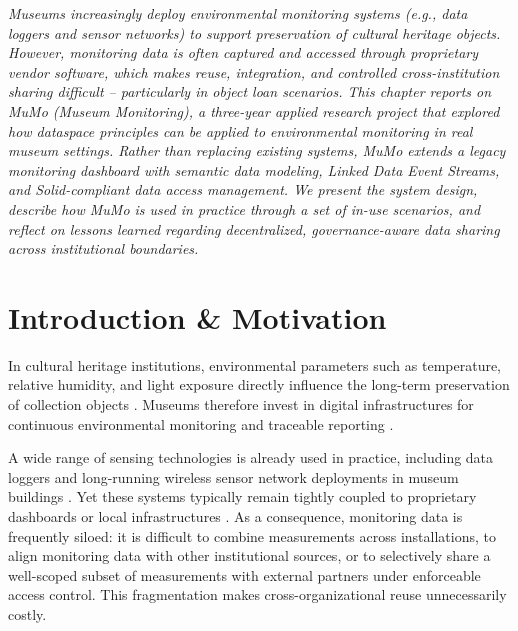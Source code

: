 \providecommand{\tightlist}{%
  \setlength{\itemsep}{0pt}\setlength{\parskip}{0pt}}

\noindent\textit{Museums increasingly deploy environmental monitoring systems (e.g., data
loggers and sensor networks) to support preservation of cultural heritage
objects. However, monitoring data is often captured and accessed through
proprietary vendor software, which makes reuse, integration, and controlled
cross-institution sharing difficult -- particularly in object loan scenarios.
This chapter reports on MuMo (Museum Monitoring), a three-year applied
research project that explored how dataspace principles can be applied to
environmental monitoring in real museum settings. Rather than replacing
existing systems, MuMo extends a legacy monitoring dashboard with semantic
data modeling, Linked Data Event Streams, and Solid-compliant data access
management. We present the system design, describe how MuMo is used in
practice through a set of in-use scenarios, and reflect on lessons learned
regarding decentralized, governance-aware data sharing across institutional
boundaries.}
\vspace{1em}

\section{Introduction \& Motivation}\label{sec:mumo-intro}

In cultural heritage institutions, environmental parameters such as
temperature, relative humidity, and light exposure directly influence
the long-term preservation of collection objects
\cite{laborda2022concept}. Museums therefore invest in digital
infrastructures for continuous environmental monitoring and traceable
reporting \cite{laborda2022concept, michalski2007ideal}.

A wide range of sensing technologies is already used in practice,
including data loggers and long-running wireless sensor network
deployments in museum buildings \cite{rodriguez2010integrating}. Yet
these systems typically remain tightly coupled to proprietary dashboards
or local infrastructures \cite{Monitoring2025}. As a consequence,
monitoring data is frequently siloed: it is difficult to combine
measurements across installations, to align monitoring data with other
institutional sources, or to selectively share a well-scoped subset of
measurements with external partners under enforceable access control.
This fragmentation makes cross-organizational reuse unnecessarily
costly.

